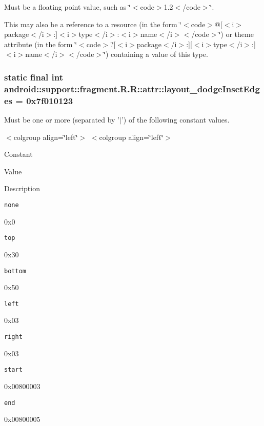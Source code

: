 Must be a floating point value, such as \char`\"{}$<$code$>$1.2$<$/code$>$\char`\"{}. 

This may also be a reference to a resource (in the form \char`\"{}$<$code$>$@\mbox{[}$<$i$>$package$<$/i$>$:\mbox{]}$<$i$>$type$<$/i$>$:$<$i$>$name$<$/i$>$$<$/code$>$\char`\"{}) or theme attribute (in the form \char`\"{}$<$code$>$?\mbox{[}$<$i$>$package$<$/i$>$:\mbox{]}\mbox{[}$<$i$>$type$<$/i$>$:\mbox{]}$<$i$>$name$<$/i$>$$<$/code$>$\char`\"{}) containing a value of this type. \hypertarget{classandroid_1_1support_1_1fragment_1_1_r_1_1attr_0b42f31fa6dc2e5f9f1ad1953c87ef4b}{
\subsubsection[{layout\_\-dodgeInsetEdges}]{\setlength{\rightskip}{0pt plus 5cm}static final int android::support::fragment.R.R::attr::layout\_\-dodgeInsetEdges = 0x7f010123}}
\label{classandroid_1_1support_1_1fragment_1_1_r_1_1attr_0b42f31fa6dc2e5f9f1ad1953c87ef4b}


Must be one or more (separated by '$|$') of the following constant values. \begin{TabularC}{0}
\hline
\end{TabularC}
$<$colgroup align=\char`\"{}left\char`\"{}$>$ $<$colgroup align=\char`\"{}left\char`\"{}$>$ 

Constant

Value

Description 

{\tt none}

0x0

{\tt top}

0x30

{\tt bottom}

0x50

{\tt left}

0x03

{\tt right}

0x03

{\tt start}

0x00800003

{\tt end}

0x00800005

